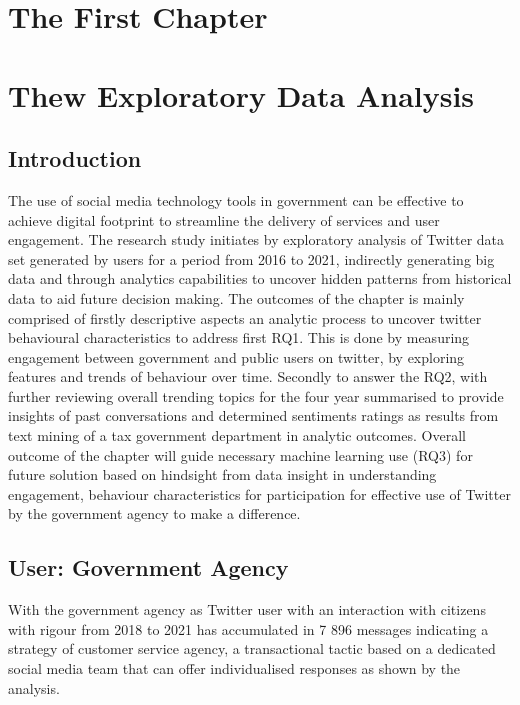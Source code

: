 \chapter{The First Chapter}
\label{chap:first}


\chapter{Thew Exploratory Data Analysis}
\label{chap:chapter4}

\section{Introduction}

The use of social media technology tools in government can be effective to  achieve digital footprint to streamline the delivery of services and user engagement.  The research study initiates by exploratory analysis of Twitter data set generated by users for a period from 2016 to 2021, indirectly generating big data and through analytics capabilities to uncover hidden patterns from historical data to aid future decision making.   The outcomes of the chapter is mainly comprised of firstly descriptive aspects an analytic process to uncover twitter behavioural characteristics to address first RQ1. This is done by measuring engagement between government and public users on twitter, by exploring features and trends of behaviour over time.  Secondly to answer the RQ2, with further reviewing overall trending topics for the four year summarised to provide insights of past conversations and determined sentiments ratings as results from text mining of a tax government department in analytic outcomes.  Overall outcome of the chapter will guide necessary machine learning use (RQ3) for future solution based on hindsight from data insight in understanding engagement, behaviour characteristics for participation for effective use of Twitter by the government agency to make a difference.\\

\section{User: Government Agency}

With the government agency as Twitter user with an interaction with citizens with rigour from 2018 to 2021 has accumulated in 7 896 messages indicating a strategy of customer service agency, a transactional tactic based on a dedicated social media team that can offer individualised responses as shown by the analysis.

